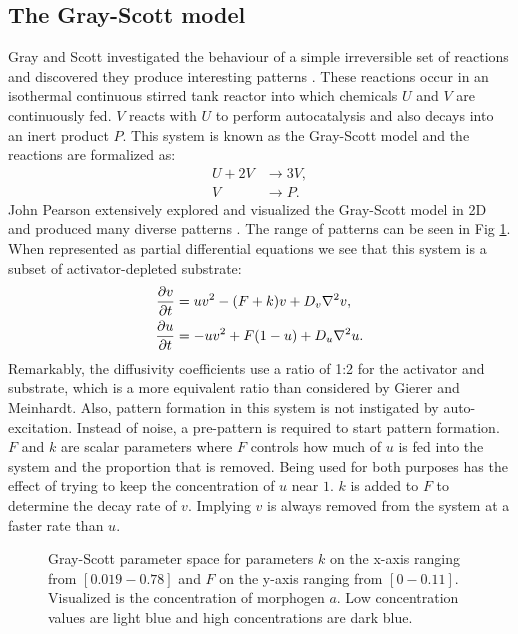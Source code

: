 \subsection{The Gray-Scott model}
Gray and Scott investigated the behaviour of a simple irreversible set of reactions and discovered they produce interesting patterns \cite{Gray1984}. These reactions occur in an isothermal continuous stirred tank reactor into which chemicals $U$ and $V$ are continuously fed. $V$ reacts with $U$ to perform autocatalysis and also decays into an inert product $P$. This system is known as the Gray-Scott model and the reactions are formalized as:
	\begin{equation}
	\begin{aligned}
	U + 2V &\to 3V, \\
	V &\to P.
	\end{aligned}
	\end{equation}
John Pearson extensively explored and visualized the Gray-Scott model in 2D and produced many diverse patterns \cite{pearson1993}. The range of patterns can be seen in Fig \ref{fig:grayscottParameterMap}. When represented as partial differential equations we see that this system is a subset of activator-depleted substrate:
	\begin{equation}
	\begin{aligned} \label{eq:grayscottRD}
	\frac{\partial v}{\partial t} &= uv^2 - (F+k)v + D_v \nabla^2 v,\\
	\frac{\partial u}{\partial t} &= -uv^2 + F(1-u) + D_u \nabla^2 u.
	\end{aligned}
	\end{equation}
Remarkably, the diffusivity coefficients use a ratio of 1:2 for the activator and substrate, which is a more equivalent ratio than considered by Gierer and Meinhardt. Also, pattern formation in this system is not instigated by auto-excitation. Instead of noise, a pre-pattern is required to start pattern formation. $F$ and $k$ are scalar parameters where $F$ controls how much of $u$ is fed into the system and the proportion that is removed. Being used for both purposes has the effect of trying to keep the concentration of $u$ near $1$. $k$ is added to $F$ to determine the decay rate of $v$. Implying $v$ is always removed from the system at a faster rate than $u$.

\begin{figure}[H]
	\centering
	\caption{Gray-Scott parameter space for parameters $k$ on the x-axis ranging from $[0.019 - 0.78]$ and $F$ on the y-axis ranging from $[0 - 0.11]$. Visualized is the concentration of morphogen $a$. Low concentration values are light blue and high concentrations are dark blue.}
	\label{fig:grayscottParameterMap}
\end{figure}

